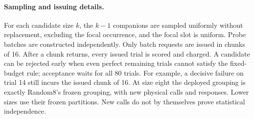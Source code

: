 \paragraph{Sampling and issuing details.}
For each candidate size $k$, the $k-1$ companions are sampled uniformly without replacement, excluding the focal occurrence, and the focal slot is uniform. Probe batches are constructed independently. Only batch requests are issued in chunks of 16. After a chunk returns, every issued trial is scored and charged. A candidate can be rejected early when even perfect remaining trials cannot satisfy the fixed-budget rule; acceptance waits for all 80 trials. For example, a decisive failure on trial 14 still incurs the issued chunk of 16. At size eight the deployed grouping is exactly Random8's frozen grouping, with new physical calls and responses. Lower sizes use their frozen partitions. New calls do not by themselves prove statistical independence.

